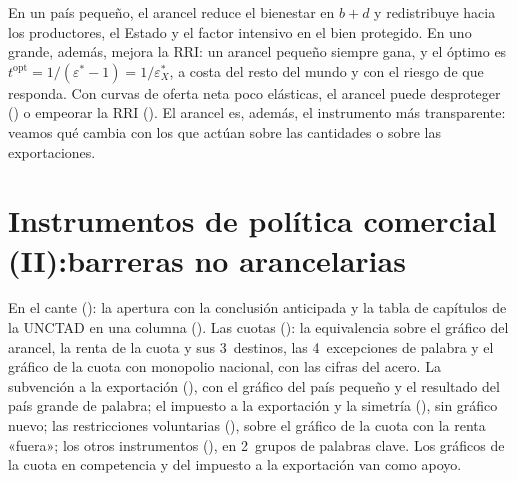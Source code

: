\documentclass[11pt]{article}
\begin{document}
\begin{ideaclave}
En un país pequeño, el arancel reduce el bienestar en $b+d$ y redistribuye hacia los productores, el Estado y el factor intensivo en el bien protegido. En uno grande, además, mejora la RRI: un arancel pequeño siempre gana, y el óptimo es $t^{\mathrm{opt}}=1/(\varepsilon^*-1)=1/\varepsilon^*_X$, a costa del resto del mundo y con el riesgo de que responda. Con curvas de oferta neta poco elásticas, el arancel puede desproteger () o empeorar la RRI (). El arancel es, además, el instrumento más transparente: veamos qué cambia con los que actúan sobre las cantidades o sobre las exportaciones.
\end{ideaclave}

\section{Instrumentos de política comercial (II):\newline barreras no arancelarias}\label{sec:no-arancelarias}

\begin{notaopositor}
En el cante (): la apertura con la conclusión anticipada y la tabla de capítulos de la UNCTAD en una columna (). Las cuotas (): la equivalencia sobre el gráfico del arancel, la renta de la cuota y sus 3~destinos, las 4~excepciones de palabra y el gráfico de la cuota con monopolio nacional, con las cifras del acero. La subvención a la exportación (), con el gráfico del país pequeño y el resultado del país grande de palabra; el impuesto a la exportación y la simetría (), sin gráfico nuevo; las restricciones voluntarias (), sobre el gráfico de la cuota con la renta «fuera»; los otros instrumentos (), en 2~grupos de palabras clave. Los gráficos de la cuota en competencia y del impuesto a la exportación van como apoyo.
\end{notaopositor}
\end{document}

